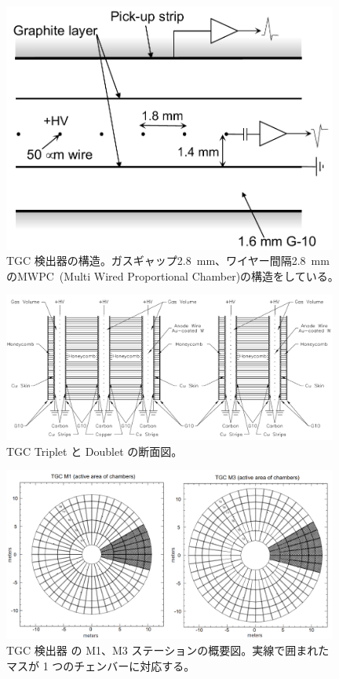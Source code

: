 \begin{figure}[tb]
  \centering
    \includegraphics[clip, width=11cm]{fig/2/TGC_anode_wire.pdf}
  \caption{TGC 検出器の構造\cite{Aad:1129811}。ガスギャップ2.8~mm、ワイヤー間隔2.8~mmのMWPC~(Multi
Wired Proportional Chamber)の構造をしている。}
  \label{fig:MWPC}
\end{figure}

\begin{figure}[tb]
  \centering
  \includegraphics[clip, width=11cm]{fig/2/TGC_construction.pdf}
  \caption{TGC Triplet と Doublet の断面図\cite{Aad:1129811}。}
  \label{fig:TGC}
\end{figure}

\begin{figure}[tb]
  \centering
  \includegraphics[clip, width=11cm]{fig/2/TGC_octant.png}
  \caption{TGC 検出器 の M1、M3 ステーションの概要図\cite{Lellouch:684103}。実線で囲まれたマスが 1 つのチェンバーに対応する。}
  \label{fig:TGC_oc}
\end{figure}

